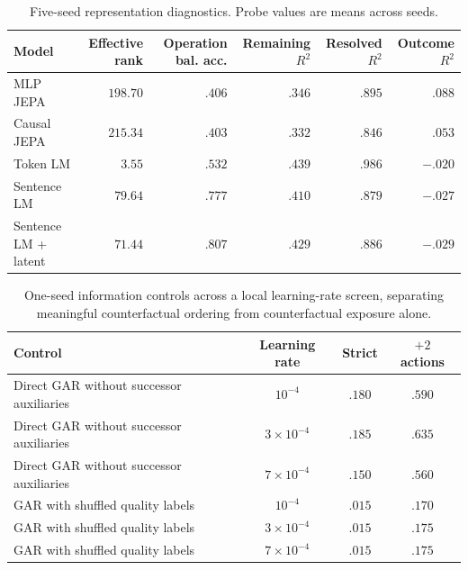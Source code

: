 \begin{table}[h]
\caption{Five-seed representation diagnostics. Probe values are means across seeds.}
\label{tab:probes}
\centering
\scriptsize
\begin{tabular}{lrrrrr}
\toprule
Model & Effective rank & Operation bal. acc. & Remaining $R^2$ & Resolved $R^2$ & Outcome $R^2$ \\
\midrule
MLP JEPA & $198.70$ & $.406$ & $.346$ & $.895$ & $.088$ \\
Causal JEPA & $215.34$ & $.403$ & $.332$ & $.846$ & $.053$ \\
Token LM & $3.55$ & $.532$ & $.439$ & $.986$ & $-.020$ \\
Sentence LM & $79.64$ & $.777$ & $.410$ & $.879$ & $-.027$ \\
Sentence LM + latent & $71.44$ & $.807$ & $.429$ & $.886$ & $-.029$ \\
\bottomrule
\end{tabular}
\end{table}

\begin{table}[h]
\caption{One-seed information controls across a local learning-rate screen, separating meaningful counterfactual ordering from counterfactual exposure alone.}
\label{tab:information-controls}
\centering
\small
\begin{tabular}{lccc}
\toprule
Control & Learning rate & Strict & $+2$ actions \\
\midrule
Direct GAR without successor auxiliaries & $10^{-4}$ & $.180$ & $.590$ \\
Direct GAR without successor auxiliaries & $3\times10^{-4}$ & $.185$ & $.635$ \\
Direct GAR without successor auxiliaries & $7\times10^{-4}$ & $.150$ & $.560$ \\
GAR with shuffled quality labels & $10^{-4}$ & $.015$ & $.170$ \\
GAR with shuffled quality labels & $3\times10^{-4}$ & $.015$ & $.175$ \\
GAR with shuffled quality labels & $7\times10^{-4}$ & $.015$ & $.175$ \\
\bottomrule
\end{tabular}
\end{table}
